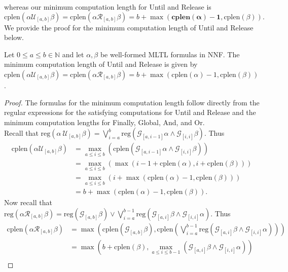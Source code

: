 \documentclass[runningheads]{llncs}
\begin{document}
whereas our minimum computation length for Until and Release is 
$$\text{cplen}(\alpha \mathcal{U}_{[a,b]} \beta) = \text{cplen}(\alpha \mathcal{R}_{[a,b]} \beta) = b + \max(\mathbf{\text{cplen}(\alpha)-1}, \text{cplen}(\beta)).$$
We provide the proof for the minimum computation length of Until and Release below.
\begin{theorem}
    Let $0 \leq a\leq b \in \mathbb{N}$ and let $\alpha, \beta$ be well-formed MLTL formulas in NNF. The minimum computation length of Until and Release is given by $\text{cplen}(\alpha \mathcal{U}_{[a,b]} \beta) = \text{cplen}(\alpha \mathcal{R}_{[a,b]} \beta) = b + \max(\text{cplen}(\alpha)-1, \text{cplen}(\beta))$.
\end{theorem}

\begin{proof}
The formulas for the minimum computation length follow directly from the regular expressions for the satisfying computations for Until and Release and the minimum computation lengths for Finally, Global, And, and Or.\\
 Recall that $\text{reg}(\alpha \ \mathcal{U}_{[a,b]} \beta) =  \bigvee_{i=a}^{b} \text{reg}\left(\mathcal{G}_{[a,i-1]}\alpha \land \mathcal{G}_{[i, i]} \beta\right)$. Thus
 \begin{align*}
     \text{cplen}(\alpha \mathcal{U}_{[a,b]} \beta) &= \max_{a \leq i \leq b} \left( \text{cplen}(\mathcal{G}_{[a, i-1]} \alpha \land \mathcal{G}_{[i,i]} \beta) \right)\\
     &= \max_{a \leq i \leq b} \left( \max(i-1 + \text{cplen}(\alpha), i + \text{cplen}(\beta))\right)\\
     &= \max_{a \leq i \leq b} \left(i + \max(\text{cplen}(\alpha) - 1, \text{cplen}(\beta))\right)\\
     &= b + \max(\text{cplen}(\alpha) - 1, \text{cplen}(\beta)).
 \end{align*}
 Now recall that $\text{reg}(\alpha \mathcal{R}_{[a,b]} \beta) =  \text{reg}\left(\mathcal{G}_{[a,b]}\beta\right) \lor \bigvee_{i=a}^{b-1} \text{reg}\left(\mathcal{G}_{[a,i]}\beta \land \mathcal{G}_{[i, i]} \alpha\right)$. Thus
 \begin{align*}
     \text{cplen}(\alpha \mathcal{R}_{[a,b]} \beta) &= \max \left( \text{cplen}(\mathcal{G}_{[a,b]} \beta), \text{cplen}\left( \bigvee_{i=a}^{b-1} \text{reg}\left(\mathcal{G}_{[a,i]}\beta \land \mathcal{G}_{[i, i]} \alpha\right) \right)  \right)\\
     &= \max\left( b + \text{cplen}(\beta), \max_{a \leq i \leq b-1} \left(\mathcal{G}_{[a,i]}\beta \land \mathcal{G}_{[i, i]} \alpha\right) \right)\\

\end{align*}
\end{proof}
\end{document}
